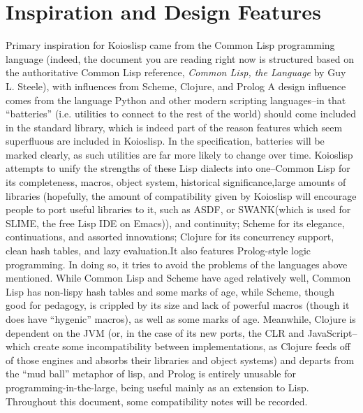 \documentclass[10pt]{book}
\begin{document}
\chapter{Inspiration and Design Features}
Primary inspiration for {\sc Koioslisp} came from the {\sc Common Lisp} programming language (indeed, the document you are reading right now is structured based on the authoritative {\sc Common Lisp} reference, \textit{Common Lisp, the Language} by Guy L. Steele)\cite{clbible}, with influences from {\sc Scheme}, {\sc Clojure}, and {\sc Prolog} A design influence comes from the language {\sc Python} and other modern scripting languages--in that ``batteries'' (i.e. utilities to connect to the rest of the world) should come included in the standard library, which is indeed part of the reason features which seem superfluous are included in {\sc Koioslisp}. In the specification, batteries will be marked clearly, as such utilities are far more likely to change over time. {\sc Koioslisp} attempts to unify the strengths of these Lisp dialects into one--{\sc Common Lisp} for its completeness, macros, object system, historical significance,large amounts of libraries (hopefully, the amount of compatibility given by {\sc Koioslisp} will encourage people to port useful libraries to it, such as ASDF, or SWANK(which is used for SLIME, the free Lisp IDE on Emacs)), and continuity; {\sc Scheme} for its elegance, continuations, and assorted innovations; {\sc Clojure} for its concurrency support, clean hash tables, and lazy evaluation.It also features {\sc Prolog}-style logic programming. In doing so, it tries to avoid the problems of the languages above mentioned. While {\sc Common Lisp} and {\sc Scheme} have aged relatively well, {\sc Common Lisp} has non-lispy hash tables and some marks of age, while {\sc Scheme}, though good for pedagogy, is crippled by its size and lack of powerful macros (though it does have ``hygenic'' macros), as well as some marks of age. Meanwhile, {\sc Clojure} is dependent on the JVM (or, in the case of its new ports, the CLR and JavaScript--which create some incompatibility between implementations, as {\sc Clojure} feeds off of those engines and absorbs their libraries and object systems) and departs from the ``mud ball'' metaphor of lisp, and {\sc Prolog} is entirely unusable for programming-in-the-large, being useful mainly as an extension to Lisp. Throughout this document, some compatibility notes will be recorded.
\end{document}
